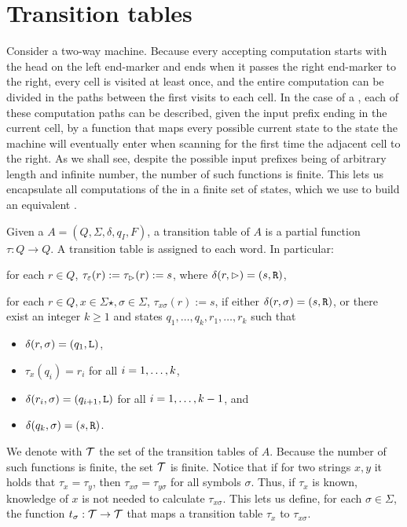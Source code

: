 \section{Transition tables}\label{sec:transtab2DFA}
Consider a two-way machine.
Because every accepting computation starts with the head on the left end-marker and ends when it passes the right end-marker to the right, every cell is visited at least once, and the entire computation can be divided in the paths between the first visits to each cell.
In the case of a \TDFA, each of these computation paths can be described, given the input prefix ending in the current cell, by a function that maps every possible current state to the state the machine will eventually enter when scanning for the first time the adjacent cell to the right.
As we shall see, despite the possible input prefixes being of arbitrary length and infinite number, the number of such functions is finite.
This lets us encapsulate all computations of the \TDFA in a finite set of states, which we use to build an equivalent \ODFA.

\begin{defn}\label{def:transtab2DFA}
	Given a \TDFA $A=(Q,\Sigma,\delta,q_I,F)$, a transition table of $A$ is a partial function $\tau:Q\to Q$.
	A transition table is assigned to each word. In particular:
	\begin{rules}
		\item for each $r\in Q$, $\tau_\varepsilon(r):=\tau_\rhd(r):=s$, where $\delta(r,\rhd)=(s,\mathtt R)$,
		\item for each $r\in Q,x\in\Sigma\star,\sigma\in\Sigma$, $\tau_{x\sigma}(r):=s$, if either $\delta(r,\sigma)=(s,\mathtt R)$, or there exist an integer $k\ge1$ and states $q_1,\dots,q_k,r_1,\dots,r_k$ such that
		\begin{itemize}
			\item $\delta(r,\sigma)=(q_1,\mathtt L)$,
			\item $\tau_x(q_i)=r_i$ for all $i=1,\dots,k$,
			\item $\delta(r_i,\sigma)=(q_{i+1},\mathtt L)$ for all $i=1,\dots,k-1$, and
			\item $\delta(q_k,\sigma)=(s,\mathtt R)$.
		\end{itemize}
	\end{rules}
	We denote with $\mathcal T$ the set of the transition tables of $A$.
	Because the number of such functions is finite, the set $\mathcal T$ is finite.
	Notice that if for two strings $x,y$ it holds that $\tau_x=\tau_y$, then $\tau_{x\sigma}=\tau_{y\sigma}$ for all symbols $\sigma$.
	Thus, if $\tau_x$ is known, knowledge of $x$ is not needed to calculate $\tau_{x\sigma}$.
	This lets us define, for each $\sigma\in\Sigma$, the function $t_\sigma:\mathcal T\to\mathcal T$ that maps a transition table $\tau_x$ to $\tau_{x\sigma}$.
\end{defn}

